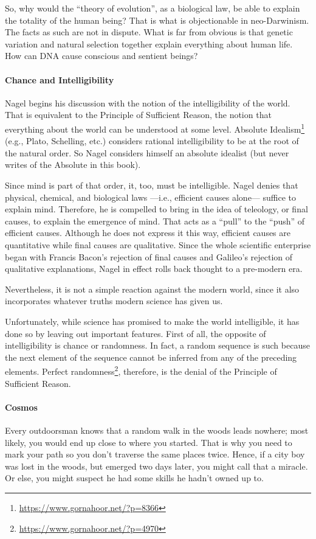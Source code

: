 So, why would the “theory of evolution”, as a biological law, be able to explain the totality of the human being? That
is what is objectionable in neo-Darwinism. The facts as such are not in dispute. What is far from obvious is that
genetic variation and natural selection together explain everything about human life. How can DNA cause conscious and
sentient beings?

\paragraph{Chance and Intelligibility}
Nagel begins his discussion with the notion of the intelligibility of the world. That is equivalent to the Principle of
Sufficient Reason, the notion that everything about the world can be understood at some level. Absolute Idealism\footnote{\url{https://www.gornahoor.net/?p=8366}} (e.g.,
Plato, Schelling, etc.) considers rational intelligibility to be at the root of the natural order. So Nagel considers
himself an absolute idealist (but never writes of the Absolute in this book).

Since mind is part of that order, it, too, must be intelligible. Nagel denies that physical, chemical, and biological
laws —i.e., efficient causes alone— suffice to explain mind. Therefore, he is compelled to bring
in the idea of teleology, or final causes, to explain the emergence of mind. That acts as a “pull” to the “push” of
efficient causes. Although he does not express it this way, efficient causes are quantitative while final causes are
qualitative. Since the whole scientific enterprise began with Francis Bacon's rejection of final causes and
Galileo's rejection of qualitative explanations, Nagel in effect rolls back thought to a pre-modern era.

Nevertheless, it is not a simple reaction against the modern world, since it also incorporates whatever truths modern
science has given us.

Unfortunately, while science has promised to make the world intelligible, it has done so by leaving out important
features. First of all, the opposite of intelligibility is chance or randomness. In fact, a random sequence is such
because the next element of the sequence cannot be inferred from any of the preceding elements. Perfect randomness\footnote{\url{https://www.gornahoor.net/?p=4970}},
therefore, is the denial of the Principle of Sufficient Reason.

\paragraph{Cosmos}
Every outdoorsman knows that a random walk in the woods leads nowhere; most likely, you would end up close to where you
started. That is why you need to mark your path so you don't traverse the same places twice. Hence, if a
city boy was lost in the woods, but emerged two days later, you might call that a miracle. Or else, you might suspect
he had some skills he hadn't owned up to.


